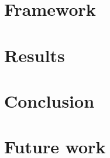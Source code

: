 \documentclass[11pt,english,openright]{book}
\begin{document}
\chapter{Framework\label{ch:framework}}


\chapter{Results\label{ch:results}}


\chapter{Conclusion\label{ch:conclusion}}


\chapter{Future work\label{ch:future-work}}





\end{document}
